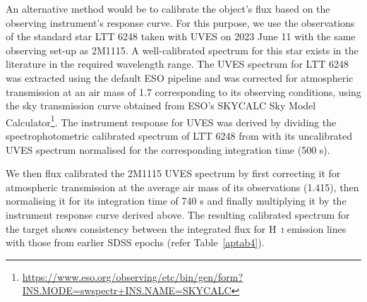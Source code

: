 \documentclass{aa}
\newcommand{\Hi}{H~\textsc{i}\xspace}
\begin{document}
\begin{appendix}
An alternative method would be to calibrate the object's flux based on the observing instrument's response curve. For this purpose, we use the observations of the standard star LTT 6248 taken with UVES on 2023 June 11 with the same observing set-up as 2M1115. A well-calibrated spectrum for this star exists in the literature \citep{rubin2022} in the required wavelength range. The UVES spectrum for LTT 6248 was extracted using the default ESO pipeline and was corrected for atmospheric transmission at an air mass of 1.7 corresponding to its observing conditions, using the sky transmission curve obtained from ESO's SKYCALC Sky Model Calculator\footnote{\url{https://www.eso.org/observing/etc/bin/gen/form?INS.MODE=swspectr+INS.NAME=SKYCALC}}. The instrument response for UVES was derived by dividing the spectrophotometric calibrated spectrum of LTT 6248 from \cite{rubin2022} with its uncalibrated UVES spectrum normalised for the corresponding integration time (500 s). 

We then flux calibrated the 2M1115 UVES spectrum by first correcting it for atmospheric transmission at the average air mass of its observations (1.415), then normalising it for its integration time of 740 s and finally multiplying it by the instrument response curve derived above. The resulting calibrated spectrum for the target shows consistency between the integrated flux for \Hi emission lines with those from earlier SDSS epochs (refer Table~\ref{aptab4}). 



\end{appendix}
\end{document}
